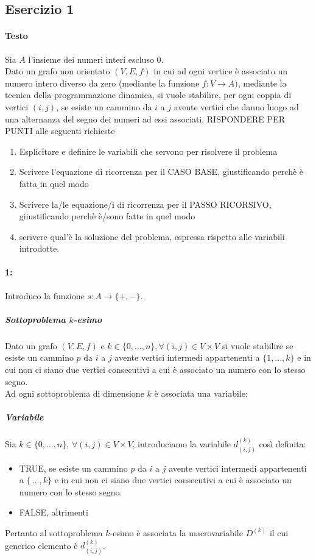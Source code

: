\documentclass[12pt, a4paper, openany]{book}
\begin{document}
\subsection{Esercizio 1}
\paragraph*{Testo}Sia $A$ l'insieme dei numeri interi escluso 0.
\\Dato un grafo non orientato $(V,E,f)$ in cui ad ogni vertice è associato un numero intero diverso da zero
(mediante la funzione $f: V\to A)$, mediante la tecnica della programmazione dinamica, si vuole stabilire, per ogni coppia di vertici $(i,j)$,
se esiste un cammino da $i$ a $j$ avente vertici che danno luogo ad una alternanza del segno dei numeri ad essi associati.
RISPONDERE PER PUNTI alle seguenti richieste
\begin{enumerate}
	\item Esplicitare e definire le variabili che servono per risolvere il problema
	\item Scrivere l'equazione di ricorrenza per il CASO BASE, giustificando perchè è fatta in quel modo
	\item Scrivere la/le equazione/i di ricorrenza per il PASSO RICORSIVO, giiustificando perchè è/sono fatte in quel modo
	\item scrivere qual'è la soluzione del problema, espressa rispetto alle variabili introdotte.
\end{enumerate}

\paragraph*{1:} 
Introduco la funzione $s: A\to \{+,-\}$.
\subparagraph*{Sottoproblema $k$-esimo}
Dato un grafo $(V,E,f)$ e $k\in \{0,...,n\}, \forall(i,j) \in V\times V$ si vuole stabilire se esiste un cammino $p$
da $i$ a $j$ avente vertici intermedi appartenenti a $\{1,...,k\}$ e in cui non ci siano due vertici consecutivi a cui è associato un numero con lo stesso segno.
\\Ad ogni sottoproblema di dimensione $k$ è associata una variabile:  
\subparagraph*{Variabile}
Sia $k\in\{0,...,n\}$, $\forall (i,j) \in V\times V$, introduciamo la variabile $d^{(k)}_{(i,j)}$ così definita:
\begin{itemize}
	\item TRUE, se esiste un cammino $p$ da $i$ a $j$ avente vertici intermedi appartenenti a $\{\,...,k\}$ e in cui non ci siano due vertici consecutivi a cui è associato un numero con lo stesso segno.
	\item FALSE, altrimenti
\end{itemize}
Pertanto al sottoproblema $k$-esimo è associata la macrovariabile $D^{(k)}$ il cui generico elemento è $d^{(k)}_{(i,j)}$.
\end{document}
